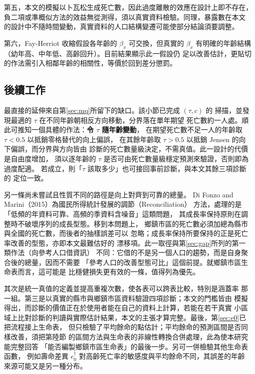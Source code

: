 \documentclass[UTF8, fontset=macnew, a4paper, 12pt]{ctexart}
\newcommand{\cn}[1]{\ding{\number\numexpr171+#1\relax}}
\newcommand{\edag}{e_0^{\dagger}}
\begin{document}
第五，本文的模擬以卜瓦松生成死亡數，因此過度離散的效應在設計上即不存在，
負二項或準概似方法的效益無從測得，須以真實資料檢驗。同理，暴露數在本文
的設計中不隨時間變動，真實資料的人口結構變遷可能使部分結論須要調整。

第六，Fay-Herriot 收縮假設各年齡的 $\beta_x$ 可交換，但真實的 $\beta_x$
有明確的年齡結構（幼年高、中年低、高齡回升）。目前結果顯示此一假設仍
足以改善估計，更貼切的作法需引入相鄰年齡的相關性，等價於回到差分懲罰。

\subsection{後續工作}

最直接的延伸來自第\ref{sec:mq}所留下的缺口。該小節已完成 $(\tau,c)$ 的
掃描，並發現最適的 $\tau$ 在不同年齡朝相反方向移動，分界落在單年期望
死亡數約一人處。順此可推知一個具體的作法：\textbf{令 $\tau$ 隨年齡變動}，
在期望死亡數不足一人的年齡取 $\tau<0.5$ 以抵銷零格替代的向上偏誤，
在其餘年齡取 $\tau>0.5$ 以抵銷 Jensen 的向下偏誤，而分界與方向皆由
診斷\cn{1}的死亡數量級決定，不需真值。此一設計的代價是自由度增加，
須以逐年齡的 $\tau$ 是否可由死亡數量級穩定預測來驗證，否則即為過度配適。
若成立，則「$\tau$ 該取多少」也可接回事前診斷，與本文其餘三項診斷的
定位一致。

另一條尚未嘗試且性質不同的路徑是向上對齊到可靠的總量。
Di Fonzo and Marini（2015）為國民所得統計發展的調節（Reconciliation）
方法，處理的是「低頻的年資料可靠、高頻的季資料含噪音」這類問題，
其成長率保持原則在調整時不破壞序列的成長型態。移到本問題上，
鄉鎮市區的死亡數必須加總為縣市與全國的死亡數，而後者的抽樣誤差可以
忽略；成長率保持所要保持的正是死亡率改善的型態，亦即本文最難估好的
漂移項。此一取徑與第\ref{sec:gap}所列的第一類作法（向參考人口借資訊）
不同：它借的不是另一個人口的趨勢，而是自身聚合後的總量，因而不需要
「參考人口的改善型態可比」這個前提。就鄉鎮市區生命表而言，這可能是
比穩健損失更有效的一條，值得列為優先。

其次是統一真值的定義並提高重複次數，使各表可以跨表比較，特別是涵蓋率
那一組。第三是以真實的縣市與鄉鎮市區資料驗證四項診斷；本文的門檻皆由
模擬得出，而診斷的價值正在於使用者能在自己的資料上計算，若能在若干真實
小區域上比對診斷的判讀與實際估計結果，本文的主張才算完整。最後，第\ref{sec:e0}已把流程接上生命表，
但只檢驗了平均餘命的點估計；平均餘命的預測區間是否同樣改善，須把第陸節
的區間方法與生命表的非線性轉換合併處理，此為使本研究能完整回答
「能否編製鄉鎮市區生命表」的最後一步。另可一併檢驗其他生命表函數，
例如壽命差異 $\edag$ 對高齡死亡率的敏感度與平均餘命不同，其誤差的年齡
來源可能又是另一種分布。
\end{document}
